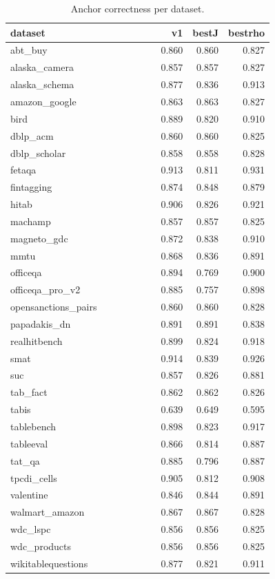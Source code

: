 \begin{table}[htbp]
\centering\scriptsize
\caption{Anchor correctness per dataset.}
\label{tab:rho_per_dataset}
\setlength{\tabcolsep}{3pt}
\begin{tabular}{p{0.764\linewidth}rrr}
\toprule
dataset & v1 & bestJ & bestrho \\
\midrule
abt\_\allowbreak{}buy & 0.860 & 0.860 & 0.827 \\
alaska\_\allowbreak{}camera & 0.857 & 0.857 & 0.827 \\
alaska\_\allowbreak{}schema & 0.877 & 0.836 & 0.913 \\
amazon\_\allowbreak{}google & 0.863 & 0.863 & 0.827 \\
bird & 0.889 & 0.820 & 0.910 \\
dblp\_\allowbreak{}acm & 0.860 & 0.860 & 0.825 \\
dblp\_\allowbreak{}scholar & 0.858 & 0.858 & 0.828 \\
fetaqa & 0.913 & 0.811 & 0.931 \\
fintagging & 0.874 & 0.848 & 0.879 \\
hitab & 0.906 & 0.826 & 0.921 \\
machamp & 0.857 & 0.857 & 0.825 \\
magneto\_\allowbreak{}gdc & 0.872 & 0.838 & 0.910 \\
mmtu & 0.868 & 0.836 & 0.891 \\
officeqa & 0.894 & 0.769 & 0.900 \\
officeqa\_\allowbreak{}pro\_\allowbreak{}v2 & 0.885 & 0.757 & 0.898 \\
opensanctions\_\allowbreak{}pairs & 0.860 & 0.860 & 0.828 \\
papadakis\_\allowbreak{}dn & 0.891 & 0.891 & 0.838 \\
realhitbench & 0.899 & 0.824 & 0.918 \\
smat & 0.914 & 0.839 & 0.926 \\
suc & 0.857 & 0.826 & 0.881 \\
tab\_\allowbreak{}fact & 0.862 & 0.862 & 0.826 \\
tabis & 0.639 & 0.649 & 0.595 \\
tablebench & 0.898 & 0.823 & 0.917 \\
tableeval & 0.866 & 0.814 & 0.887 \\
tat\_\allowbreak{}qa & 0.885 & 0.796 & 0.887 \\
tpcdi\_\allowbreak{}cells & 0.905 & 0.812 & 0.908 \\
valentine & 0.846 & 0.844 & 0.891 \\
walmart\_\allowbreak{}amazon & 0.867 & 0.867 & 0.828 \\
wdc\_\allowbreak{}lspc & 0.856 & 0.856 & 0.825 \\
wdc\_\allowbreak{}products & 0.856 & 0.856 & 0.825 \\
wikitablequestions & 0.877 & 0.821 & 0.911 \\
\bottomrule
\end{tabular}
\end{table}
